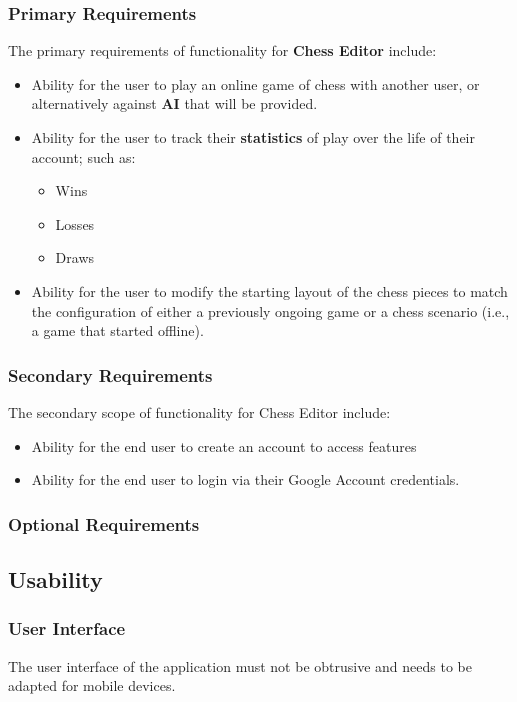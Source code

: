 \documentclass[11pt]{article}
\begin{document}
\subsubsection{Primary Requirements}
\label{sec:org00f27d8}
The primary requirements of functionality for \textbf{Chess Editor}  include:
\begin{itemize}
\item Ability for the user to play an online game of chess with
another user, or alternatively against \textbf{AI} that will be
provided.
\item Ability for the user to track their \textbf{statistics} of play over
the life of their account; such as:
\begin{itemize}
\item Wins
\item Losses
\item Draws
\end{itemize}
\item Ability for the user to modify the starting layout of the chess
pieces to match the configuration of either a previously ongoing
game or a chess scenario (i.e., a game that started offline).
\end{itemize}
\subsubsection{Secondary Requirements}
\label{sec:org5898cea}
The secondary scope of functionality for Chess Editor include:
\begin{itemize}
\item Ability for the end user to create an account to access features
\item Ability for the end user to login via their Google Account credentials.
\end{itemize}
\subsubsection{Optional Requirements}
\label{sec:org4724383}
\subsection{Usability}
\label{sec:org959cf7b}
\subsubsection{User Interface}
\label{sec:org99a4ed1}
The user interface of the application must not be obtrusive and
needs to be adapted for mobile devices.
\end{document}
